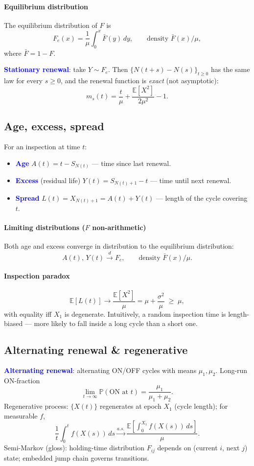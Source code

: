 \paragraph{Equilibrium distribution} The
\textcolor{Bittersweet}{equilibrium distribution} of $F$ is
\[F_e(x) = \frac{1}{\mu}\int_0^x \bar F(y)\,dy,\qquad \text{density } \bar
F(x)/\mu,\]
where $\bar F = 1 - F$.

\textcolor{Blue}{\textbf{Stationary renewal}}: take $Y \sim F_e$. Then
$\{N(t+s) - N(s)\}_{t\ge 0}$ has the same law for every $s \ge 0$, and the
renewal function is \emph{exact} (not asymptotic):
\[m_s(t) = \frac{t}{\mu} + \frac{\mathbb{E}[X^2]}{2\mu^2} - 1.\]

\subsection{Age, excess, spread}
For an inspection at time $t$:
\begin{itemize}
  \item \textcolor{Blue}{\textbf{Age}} $A(t) = t - S_{N(t)}$ — time since last
    renewal.
  \item \textcolor{Blue}{\textbf{Excess}} (residual life) $Y(t) = S_{N(t)+1} -
    t$ — time until next renewal.
  \item \textcolor{Blue}{\textbf{Spread}} $L(t) = X_{N(t)+1} = A(t) + Y(t)$ — length of
    the cycle covering $t$.
\end{itemize}
\paragraph{Limiting distributions ($F$ non-arithmetic)} Both age and excess
converge in distribution to the equilibrium distribution:
\[A(t),\, Y(t) \xrightarrow{d} F_e,\qquad \text{density } \bar F(x)/\mu.\]

\paragraph{Inspection paradox}
\[\mathbb{E}[L(t)] \to \frac{\mathbb{E}[X^2]}{\mu} = \mu + \frac{\sigma^2}{\mu}
\;\ge\; \mu,\]
with equality iff $X_1$ is degenerate. Intuitively, a random inspection time is
\textcolor{Bittersweet}{length-biased} — more likely to fall inside a long
cycle than a short one.

\subsection{Alternating renewal \& regenerative}
\textcolor{Blue}{\textbf{Alternating renewal}}: alternating ON/OFF cycles with
means $\mu_1,\mu_2$. Long-run ON-fraction
\[\lim_{t\to\infty}\mathbb{P}(\text{ON at }t)=\frac{\mu_1}{\mu_1+\mu_2}.\]
\textcolor{Bittersweet}{Regenerative process}: $\{X(t)\}$ regenerates at epoch
$X_1$ (cycle length); for measurable $f$,
\[\frac{1}{t}\!\int_0^t\! f(X(s))\,ds\xrightarrow{a.s.}
\frac{\mathbb{E}\!\left[\int_0^{X_1}\! f(X(s))\,ds\right]}{\mu}.\]
\textcolor{Bittersweet}{Semi-Markov (gloss)}: holding-time distribution $F_{ij}$
depends on (current $i$, next $j$) state; embedded jump chain governs transitions.
